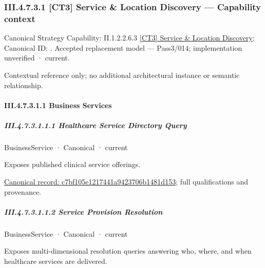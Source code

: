 \subsubsection*{III.4.7.3.1 [CT3] Service \& Location Discovery — Capability context}
\label{navigation:III.4.7.3.1}

{\small Canonical Strategy Capability: II.1.2.2.6.3 \hyperref[element:8c313972197c48369767dec1a745d7fc]{[CT3] Service \& Location Discovery}; Canonical ID: \texttt{}. Accepted replacement model — Pass3/014; implementation unverified · current.}\par
Contextual reference only; no additional architectural instance or semantic relationship.\par
\paragraph*{III.4.7.3.1.1 Business Services}
\label{navigation:III.4.7.3.1.1}

\subparagraph*{III.4.7.3.1.1.1 Healthcare Service Directory Query}
\label{navigation:III.4.7.3.1.1.1}

\label{element:c7bf105e1217441a9423706b1481d153}
{\small BusinessService · Canonical · current}\par

Exposes published clinical service offerings.


{\footnotesize \href{../../../../../../../../continuum/business/business-service/c7bf105e1217441a9423706b1481d153.md}{Canonical record: c7bf105e1217441a9423706b1481d153}; full qualifications and provenance.}\par
\subparagraph*{III.4.7.3.1.1.2 Service Provision Resolution}
\label{navigation:III.4.7.3.1.1.2}

\label{element:e54866d88b1e442f8ea170f06f98028b}
{\small BusinessService · Canonical · current}\par

Exposes multi-dimensional resolution queries answering who, where, and when healthcare services are delivered.


